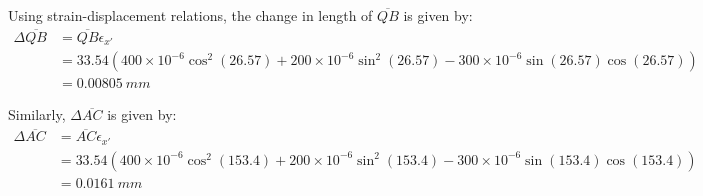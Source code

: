 Using strain-displacement relations, the change in length of $\overline{QB}$ is given by:
\begin{align*}
    \Delta\overline{QB} &= \overline{QB}\epsilon_{x'} \\
    &= 33.54(400\times10^{-6}\cos^2(26.57) + 200\times10^{-6}\sin^2(26.57) - 300\times10^{-6}\sin(26.57)\cos(26.57)) \\
    &= \boxed{\qty{0.00805}{mm}}
\end{align*}

Similarly, $\Delta \overline{AC}$ is given by:
\begin{align*}
    \Delta\overline{AC} &= \overline{AC}\epsilon_{x'} \\
    &= 33.54(400\times10^{-6}\cos^2(153.4) + 200\times10^{-6}\sin^2(153.4) - 300\times10^{-6}\sin(153.4)\cos(153.4)) \\
    &= \boxed{\qty{0.0161}{mm}}
\end{align*}
